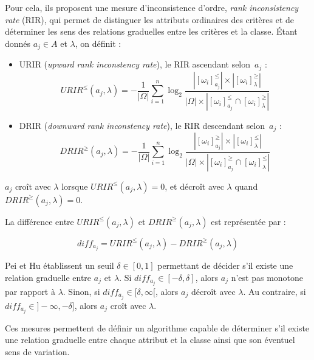 \documentclass[a4paper]{article}
\begin{document}
Pour cela, ils proposent une mesure d'inconsistence d'ordre, \emph{rank
inconsistency rate} (RIR), qui permet de distinguer les attributs ordinaires des
critères et de déterminer les sens des relations graduelles entre les critères
et la classe. Étant donnés $a_j \in A$ et $\lambda$, on définit :

\begin{itemize}
    \item URIR (\emph{upward rank inconstency rate}), le RIR ascendant selon~$a_j$ :
        \begin{equation}
            URIR^{\leq}(a_j, \lambda) = -\frac{1}{|\Omega|} \sum_{i=1}^{n}\log_{2}
            \frac{|[\omega_i]^{\leq}_{a_j}| \times
            |[\omega_i]^{\geq}_{\lambda}|}{|\Omega| \times |[\omega_i]^{\leq}_{a_j}
            \cap [\omega_i]^{\geq}_{\lambda}|}
        \label{eq:URIR}
        \end{equation}
    \item DRIR (\emph{downward rank inconstency rate}), le RIR
        descendant selon~$a_j$ : 
        \begin{equation}
            DRIR^{\geq}(a_j, \lambda) = -\frac{1}{|\Omega|} \sum_{i=1}^{n}\log_{2}
            \frac{|[\omega_i]^{\geq}_{a_j}| \times
            |[\omega_i]^{\leq}_{\lambda}|}{|\Omega| \times |[\omega_i]^{\geq}_{a_j}
            \cap [\omega_i]^{\leq}_{\lambda}|}
        \label{eq:DRIR}
        \end{equation}
\end{itemize}

$a_j$ croît avec $\lambda$ lorsque
$URIR^{\leq}(a_j,\lambda) = 0$, et décroît avec $\lambda$
quand $DRIR^{\geq}(a_j,\lambda) = 0$.

La différence entre $URIR^{\leq}(a_j,\lambda)$ et $DRIR^{\geq}(a_j,\lambda)$
est représentée par :

\begin{equation}
    diff_{a_j} = URIR^{\leq}(a_j,\lambda) - DRIR^{\geq}(a_j,\lambda)
\end{equation}

Pei et Hu \cite{pei-partially} établissent un seuil $\delta \in [0,1]$
permettant de décider s'il existe une relation graduelle entre $a_j$ et
$\lambda$. Si $diff_{a_j} \in [-\delta, \delta]$, alors $a_j$ n'est pas monotone
par rapport à $\lambda$.  Sinon, si $diff_{a_j} \in [\delta, \infty[$, alors
$a_j$ décroît avec $\lambda$.  Au contraire, si $diff_{a_j} \in ]-\infty,
-\delta]$, alors $a_j$ croît avec $\lambda$.

Ces mesures permettent de définir un algorithme capable de déterminer s'il
existe une relation graduelle entre chaque attribut et la classe ainsi que son
éventuel sens de variation.
\end{document}
